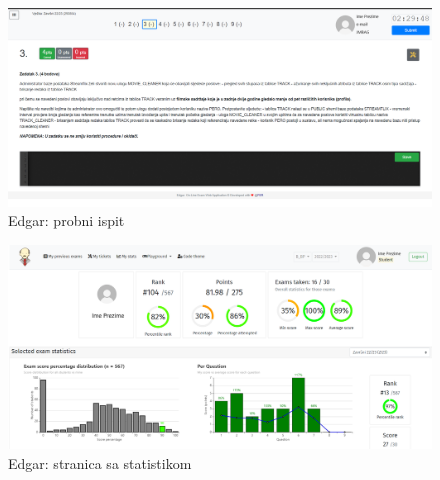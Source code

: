 		
		\\
	
		
		\begin{figure}[H]
			\includegraphics[scale=0.4]{slike/edgar3}
			\centering
			\caption{Edgar: probni ispit}
			\label{fig:ispit}
		\end{figure}
		
		\begin{figure}[H]
			\includegraphics[scale=0.4]{slike/edgar2}
			\centering
			\caption{Edgar: stranica sa statistikom}
			\label{fig:stats}
		\end{figure}
		
